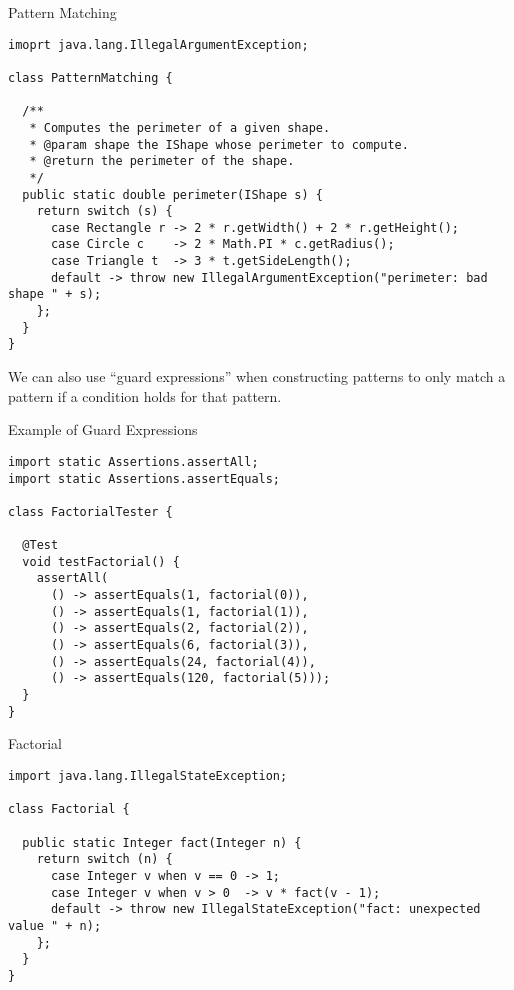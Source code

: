 \begin{cl}[]{Pattern Matching}
\begin{lstlisting}[language=MyJava]
imoprt java.lang.IllegalArgumentException;

class PatternMatching {

  /**
   * Computes the perimeter of a given shape.
   * @param shape the IShape whose perimeter to compute.
   * @return the perimeter of the shape.
   */
  public static double perimeter(IShape s) {
    return switch (s) {
      case Rectangle r -> 2 * r.getWidth() + 2 * r.getHeight();
      case Circle c    -> 2 * Math.PI * c.getRadius();
      case Triangle t  -> 3 * t.getSideLength();
      default -> throw new IllegalArgumentException("perimeter: bad shape " + s);
    };
  }
}
\end{lstlisting}
\end{cl}

We can also use ``guard expressions'' when constructing patterns to only match a pattern if a condition holds for that pattern.


\begin{cl}[]{Example of Guard Expressions} 
\begin{lstlisting}[language=MyJava]
import static Assertions.assertAll;
import static Assertions.assertEquals;

class FactorialTester {

  @Test
  void testFactorial() {
    assertAll(
      () -> assertEquals(1, factorial(0)),
      () -> assertEquals(1, factorial(1)),
      () -> assertEquals(2, factorial(2)),
      () -> assertEquals(6, factorial(3)),
      () -> assertEquals(24, factorial(4)),
      () -> assertEquals(120, factorial(5)));
  }
}
\end{lstlisting}
\end{cl}

\begin{cl}[]{Factorial}
\begin{lstlisting}[language=MyJava]
import java.lang.IllegalStateException;

class Factorial {

  public static Integer fact(Integer n) {
    return switch (n) {
      case Integer v when v == 0 -> 1;
      case Integer v when v > 0  -> v * fact(v - 1);
      default -> throw new IllegalStateException("fact: unexpected value " + n);
    };
  }
}
\end{lstlisting}
\end{cl}

